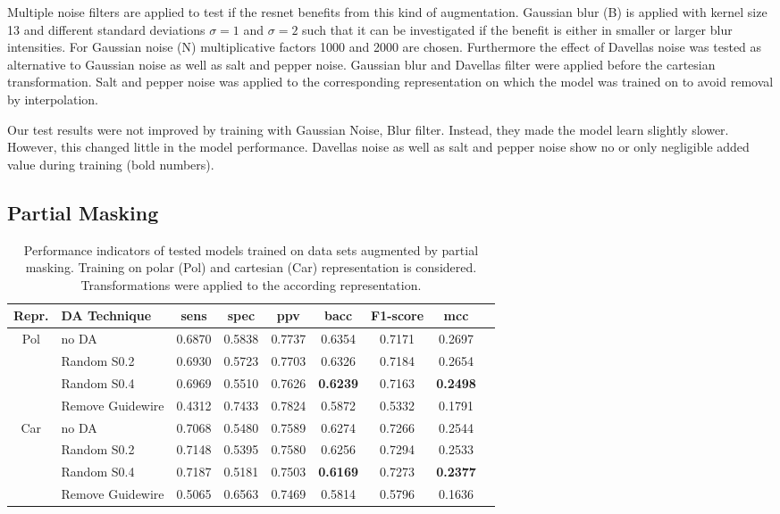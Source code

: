 Multiple noise filters are applied to test if the \acrshort{resnet} benefits from this kind of augmentation. Gaussian blur (B) is applied with kernel size 13 and different standard deviations \( \sigma = 1 \) and \( \sigma = 2 \) such that it can be investigated if the benefit is either in smaller or larger blur intensities. For Gaussian noise (N) multiplicative factors 1000 and 2000 are chosen. Furthermore the effect of Davellas noise was tested as alternative to Gaussian noise as well as salt and pepper noise. Gaussian blur and Davellas \cite{Devalla.2018} filter were applied before the cartesian transformation. Salt and pepper noise was applied to the corresponding representation on which the model was trained on to avoid removal by interpolation. 

Our test results were not improved by training with Gaussian Noise, Blur filter. Instead, they made the model learn slightly slower. However, this changed little in the model performance. Davellas noise as well as salt and pepper noise show no or only negligible added value during training (bold numbers).


\subsection{Partial Masking}

\begin{table}[H]
    \centering
    \begin{tabular}{|c|l|c|c|c|c|c|c|c|}
        \hline
        Repr. & DA Technique & \acrshort{sens} & \acrshort{spec} & \acrshort{ppv} & \acrshort{bacc} & F1-score & \acrshort{mcc} \\\hline\hline
        \multirow{4}{2em}{Pol} & no DA & 0.6870 & 0.5838 & 0.7737 & 0.6354 & 0.7171 & 0.2697 \\
         & Random S0.2 & 0.6930 & 0.5723 & 0.7703 & 0.6326 & 0.7184 & 0.2654 \\
         & Random S0.4 & 0.6969 & 0.5510 & 0.7626 & \textbf{0.6239} & 0.7163 & \textbf{0.2498} \\
         & Remove Guidewire & 0.4312 & 0.7433 & 0.7824 & 0.5872 & 0.5332 & 0.1791 \\
        \hline
        \multirow{4}{2em}{Car} & no DA & 0.7068 & 0.5480 & 0.7589 & 0.6274 & 0.7266 & 0.2544 \\
         & Random S0.2 & 0.7148 & 0.5395 & 0.7580 & 0.6256 & 0.7294 & 0.2533 \\
         & Random S0.4 & 0.7187 & 0.5181 & 0.7503 & \textbf{0.6169} & 0.7273 & \textbf{0.2377} \\
         & Remove Guidewire & 0.5065 & 0.6563 & 0.7469 & 0.5814 & 0.5796 & 0.1636 \\
        \hline
    \end{tabular}
    \caption[Partial masking]{Performance indicators of tested models trained on data sets augmented by partial masking. Training on polar (Pol) and cartesian (Car) representation is considered. Transformations were applied to the according representation.}
    \label{tab:partial_masking}
\end{table}

